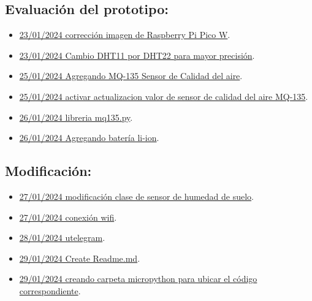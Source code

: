 \subsection{Evaluación del prototipo:}
\begin{itemize}
\item \href{https://github.com/JLCaballeroMQ/Proyecto_TFG_UBU_23_24/tree/7a8e4797d4beccac2154441b5f58c06a0fb897e1}{23/01/2024 corrección imagen de Raspberry Pi Pico W}.
\item \href{https://github.com/JLCaballeroMQ/Proyecto_TFG_UBU_23_24/tree/427464aacd4f928b9e289856624a46a3d6396f0f}{23/01/2024 Cambio DHT11 por DHT22 para mayor precisión}.
\item \href{https://github.com/JLCaballeroMQ/Proyecto_TFG_UBU_23_24/tree/7cc624a24d9c55fcda34d729ce8ad786b8e3f09a}{25/01/2024 Agregando MQ-135 Sensor de Calidad del aire}.
\item \href{https://github.com/JLCaballeroMQ/Proyecto_TFG_UBU_23_24/tree/b5379807ec368184ad950f4e7b9a146093f6e6e3}{25/01/2024 activar actualizacion valor de sensor de calidad del aire MQ-135}.
\item \href{https://github.com/JLCaballeroMQ/Proyecto_TFG_UBU_23_24/tree/a2555b5ba84b78c3436fc82d044bb32968428102}{26/01/2024 libreria mq135.py}.
\item \href{https://github.com/JLCaballeroMQ/Proyecto_TFG_UBU_23_24/tree/1a039b3c8fdc5c2627f46f62ef4b9e2bbd54c205}{26/01/2024 Agregando batería li-ion}.
\end{itemize}

\subsection{Modificación:}
\begin{itemize}
\item \href{https://github.com/JLCaballeroMQ/Proyecto_TFG_UBU_23_24/tree/f3ced8cc9d92da3067f8a2c88764539d0f8f5c07}{27/01/2024 modificación clase de sensor de humedad de suelo}.
\item \href{https://github.com/JLCaballeroMQ/Proyecto_TFG_UBU_23_24/tree/79baaa913bfe3e28a3727e569ea3ac71700de482}{27/01/2024 conexión wifi}.
\item \href{https://github.com/JLCaballeroMQ/Proyecto_TFG_UBU_23_24/tree/cbcb95bd5bbfe7cbc38c848d1082c4fa8018233f}{28/01/2024 utelegram}.
\item \href{https://github.com/JLCaballeroMQ/Proyecto_TFG_UBU_23_24/tree/446a04def85eb45d726e5e43e06510d1596eb0a6}{29/01/2024 Create Readme.md}.
\item \href{https://github.com/JLCaballeroMQ/Proyecto_TFG_UBU_23_24/tree/36b1875d18072b0d159ce1c946f4fab3172fdc6c}{29/01/2024 creando carpeta micropython para ubicar el código correspondiente}.
\end{itemize}


